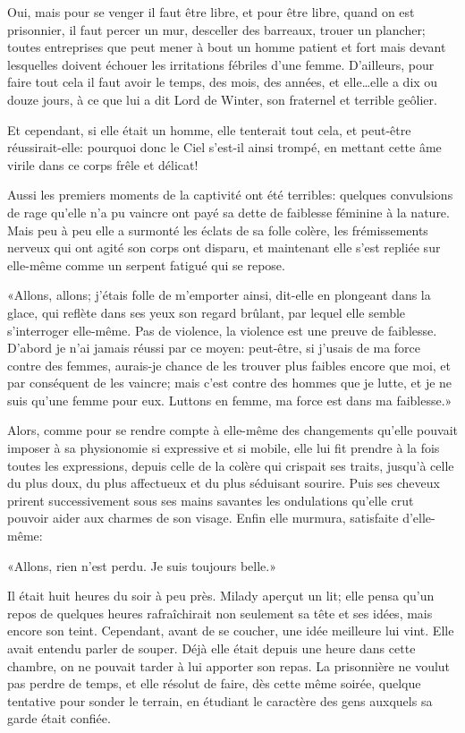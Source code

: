 Oui, mais pour se venger il faut être libre, et pour être libre, quand on est prisonnier, il faut percer un mur, desceller des barreaux, trouer un plancher; toutes entreprises que peut mener à bout un homme patient et fort mais devant lesquelles doivent échouer les irritations fébriles d'une femme. D'ailleurs, pour faire tout cela il faut avoir le temps, des mois, des années, et elle\dots elle a dix ou douze jours, à ce que lui a dit Lord de Winter, son fraternel et terrible geôlier. 

Et cependant, si elle était un homme, elle tenterait tout cela, et peut-être réussirait-elle: pourquoi donc le Ciel s'est-il ainsi trompé, en mettant cette âme virile dans ce corps frêle et délicat! 

Aussi les premiers moments de la captivité ont été terribles: quelques convulsions de rage qu'elle n'a pu vaincre ont payé sa dette de faiblesse féminine à la nature. Mais peu à peu elle a surmonté les éclats de sa folle colère, les frémissements nerveux qui ont agité son corps ont disparu, et maintenant elle s'est repliée sur elle-même comme un serpent fatigué qui se repose. 

«Allons, allons; j'étais folle de m'emporter ainsi, dit-elle en plongeant dans la glace, qui reflète dans ses yeux son regard brûlant, par lequel elle semble s'interroger elle-même. Pas de violence, la violence est une preuve de faiblesse. D'abord je n'ai jamais réussi par ce moyen: peut-être, si j'usais de ma force contre des femmes, aurais-je chance de les trouver plus faibles encore que moi, et par conséquent de les vaincre; mais c'est contre des hommes que je lutte, et je ne suis qu'une femme pour eux. Luttons en femme, ma force est dans ma faiblesse.» 

Alors, comme pour se rendre compte à elle-même des changements qu'elle pouvait imposer à sa physionomie si expressive et si mobile, elle lui fit prendre à la fois toutes les expressions, depuis celle de la colère qui crispait ses traits, jusqu'à celle du plus doux, du plus affectueux et du plus séduisant sourire. Puis ses cheveux prirent successivement sous ses mains savantes les ondulations qu'elle crut pouvoir aider aux charmes de son visage. Enfin elle murmura, satisfaite d'elle-même: 

«Allons, rien n'est perdu. Je suis toujours belle.» 

Il était huit heures du soir à peu près. Milady aperçut un lit; elle pensa qu'un repos de quelques heures rafraîchirait non seulement sa tête et ses idées, mais encore son teint. Cependant, avant de se coucher, une idée meilleure lui vint. Elle avait entendu parler de souper. Déjà elle était depuis une heure dans cette chambre, on ne pouvait tarder à lui apporter son repas. La prisonnière ne voulut pas perdre de temps, et elle résolut de faire, dès cette même soirée, quelque tentative pour sonder le terrain, en étudiant le caractère des gens auxquels sa garde était confiée. 

